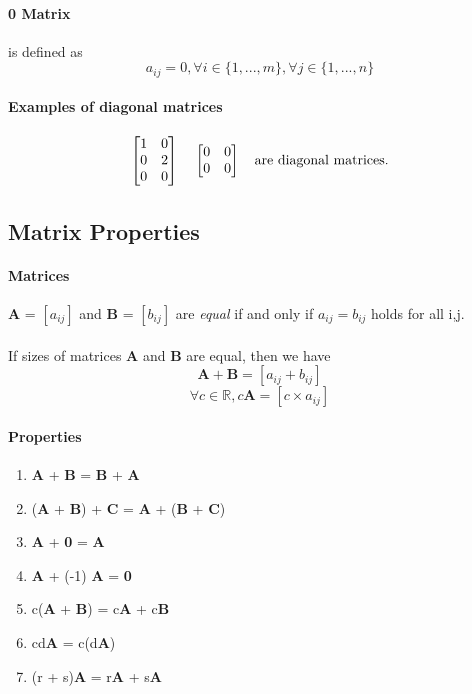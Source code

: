 \documentclass{article}
\begin{document}
	\paragraph{0 Matrix} is defined as 
	\[
	a_{ij} = 0, \forall i \in \{1,...,m\}, \forall j \in \{1,...,n\}
	\]
	\paragraph{Examples of diagonal matrices}
	\[
	\begin{bmatrix}
		1 & 0 \\
		0 & 2 \\
		0 & 0 \\
	\end{bmatrix}
	\text{\quad}
	\begin{bmatrix}
		0 & 0 \\
		0 & 0 \\
	\end{bmatrix}
	\text{\quad are diagonal matrices.}
	\]
	\subsection{Matrix Properties}
	\paragraph{Matrices} \textbf{A} = $[a_{ij}]$ and \textbf{B} = $[b_{ij}]$ are \emph{equal} if and only if $a_{ij} = b_{ij}$ holds for all i,j.
	\paragraph{} If sizes of matrices \textbf{A} and \textbf{B} are equal, then we have
	\[
	\textbf{A} + \textbf{B} = [a_{ij} + b_{ij}]
	\]
	\[
	\forall c \in \mathbb{R}, c \textbf{A} = [c \times a_{ij}]
	\]
	\paragraph{Properties}
	\begin{enumerate}
		\item \textbf{A} + \textbf{B} = \textbf{B} + \textbf{A}
		\item (\textbf{A} + \textbf{B}) + \textbf{C} = \textbf{A} + (\textbf{B} + \textbf{C})
		\item \textbf{A} + \textbf{0} = \textbf{A}
		\item \textbf{A} + (-1) \textbf{A} = \textbf{0}
		\item c(\textbf{A} + \textbf{B}) = c\textbf{A} + c\textbf{B}
		\item cd\textbf{A} = c(d\textbf{A})
		\item (r + s)\textbf{A} = r\textbf{A} + s\textbf{A}
	\end{enumerate}
\end{document}
